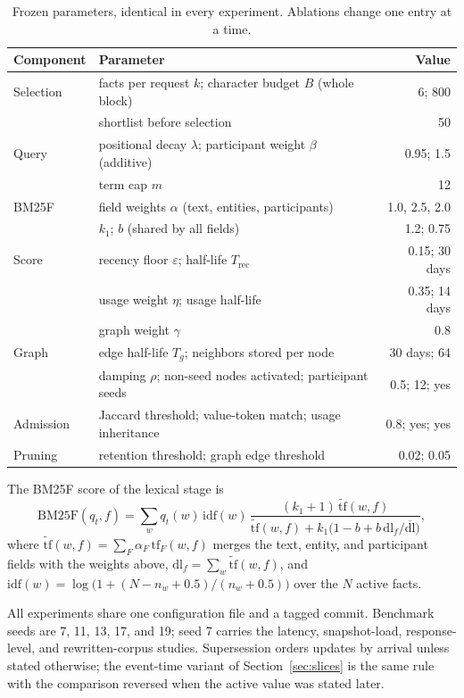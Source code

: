 \documentclass{article} %
\begin{document}
\begin{table}[h]
\centering
\small
\begin{tabular}{@{}llr@{}}
\toprule
Component & Parameter & Value \\
\midrule
Selection & facts per request $k$; character budget $B$ (whole block) & 6; 800 \\
 & shortlist before selection & 50 \\
Query & positional decay $\lambda$; participant weight $\beta$ (additive) & 0.95; 1.5 \\
 & term cap $m$ & 12 \\
BM25F & field weights $\alpha$ (text, entities, participants) & 1.0, 2.5, 2.0 \\
 & $k_1$; $b$ (shared by all fields) & 1.2; 0.75 \\
Score & recency floor $\varepsilon$; half-life $T_{\mathrm{rec}}$ & 0.15; 30 days \\
 & usage weight $\eta$; usage half-life & 0.35; 14 days \\
 & graph weight $\gamma$ & 0.8 \\
Graph & edge half-life $T_g$; neighbors stored per node & 30 days; 64 \\
 & damping $\rho$; non-seed nodes activated; participant seeds & 0.5; 12; yes \\
Admission & Jaccard threshold; value-token match; usage inheritance & 0.8; yes; yes \\
Pruning & retention threshold; graph edge threshold & 0.02; 0.05 \\
\bottomrule
\end{tabular}
\caption{Frozen parameters, identical in every experiment. Ablations change one entry at a time.}
\label{tab:config}
\end{table}

The BM25F score of the lexical stage is
\begin{equation}
\mathrm{BM25F}(q_t,f)=\sum_w q_t(w)\,\mathrm{idf}(w)\,\frac{(k_1+1)\,\widetilde{\mathrm{tf}}(w,f)}{\widetilde{\mathrm{tf}}(w,f)+k_1\bigl(1-b+b\,\mathrm{dl}_f/\overline{\mathrm{dl}}\bigr)},
\end{equation}
where $\widetilde{\mathrm{tf}}(w,f)=\sum_F\alpha_F\,\mathrm{tf}_F(w,f)$ merges the text, entity, and participant fields with the weights above, $\mathrm{dl}_f=\sum_w\widetilde{\mathrm{tf}}(w,f)$, and $\mathrm{idf}(w)=\log\bigl(1+(N-n_w+0.5)/(n_w+0.5)\bigr)$ over the $N$ active facts.

All experiments share one configuration file and a tagged commit. Benchmark seeds are 7, 11, 13, 17, and 19; seed 7 carries the latency, snapshot-load, response-level, and rewritten-corpus studies. Supersession orders updates by arrival unless stated otherwise; the event-time variant of Section~\ref{sec:slices} is the same rule with the comparison reversed when the active value was stated later.
\end{document}
